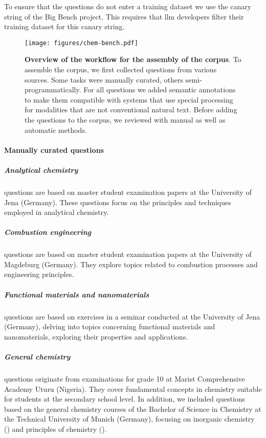 \documentclass[11pt, oneside]{article}
\begin{document}
\begin{refsection}
To ensure that the questions do not enter a training dataset we use the canary string of the Big Bench project.
This requires that \Gls{llm} developers filter their training dataset for this canary string.\autocite{openai2024gpt4, srivastava2022beyond}

\begin{figure}[htb]
    \texttt{[image: figures/chem-bench.pdf]}
    \caption{\textbf{Overview of the workflow for the assembly of the \chembench corpus}. To assemble the \chembench corpus, we first collected questions from various sources. Some tasks were manually curated, others semi-programmatically. For all questions we added semantic annotations to make them compatible with systems that use special processing for modalities that are not conventional natural text. Before adding the questions to the corpus, we reviewed with manual as well as automatic methods.}
    \label{fig:curation_workflow}
\end{figure}

\paragraph{Manually curated questions}

\subparagraph{Analytical chemistry}
 questions are based on master student examination papers at the University of Jena (Germany). 
These questions focus on the principles and techniques employed in analytical chemistry.

\subparagraph{Combustion engineering}
 questions are based on master student examination papers at the University of Magdeburg (Germany). 
They explore topics related to combustion processes and engineering principles.

\subparagraph{Functional materials and nanomaterials}
  questions are based on exercises in a seminar conducted at the University of Jena (Germany), delving into topics concerning functional materials and nanomaterials, exploring their properties and applications.

\subparagraph{General chemistry}
 questions originate from examinations for grade 10 at Marist Comprehensive Academy Uturu (Nigeria). 
They cover fundamental concepts in chemistry suitable for students at the secondary school level.
In addition, we included questions based on the general chemistry courses of the Bachelor of Science in Chemistry at the Technical University of Munich (Germany), focusing on inorganic chemistry () and principles of chemistry ().


\end{refsection}
\end{document}
